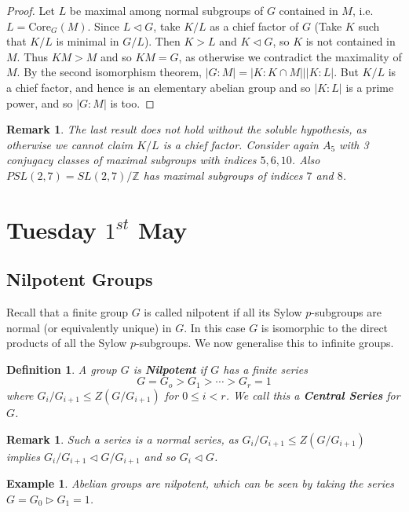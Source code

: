\documentclass[a4paper,10pt]{article}
\newcommand{\ZZ}{\mathbb{Z}}
\newtheorem{Def}[thm]{Definition}
\newtheorem{eg}[thm]{Example}
\newtheorem{rem}[thm]{Remark}
\begin{document}
\begin{proof}
Let $L$ be maximal among normal subgroups of $G$ contained in $M$, i.e. $L = \text{Core}_G(M)$. Since $L \triangleleft G$, take $K / L$ as a chief factor of $G$ (Take $K$ such that $K / L$ is minimal in $G / L$). Then $K > L$ and $K \triangleleft G$, so $K$ is not contained in $M$. Thus $KM > M$ and so $KM = G$, as otherwise we contradict the maximality of $M$. By the second isomorphism theorem, $|G : M| = |K : K \cap M| \big| |K : L|$. But $K  / L$ is a chief factor, and hence is an elementary abelian group and so $|K : L |$ is a prime power, and so $|G:M|$ is too.
\end{proof}

\begin{rem}
The last result does not hold without the soluble hypothesis, as otherwise we cannot claim $K / L$ is a chief factor. Consider again $A_5$ with 3 conjugacy classes of maximal subgroups with indices $5,6,10$. Also $PSL(2,7) = SL(2,7) / \ZZ$ has maximal subgroups of indices $7$ and $8$.
\end{rem}


\newpage
\section{Tuesday $1^{st}$ May}
\subsection*{Nilpotent Groups}
Recall that a finite group $G$ is called nilpotent if all its Sylow $p$-subgroups are normal (or equivalently unique) in $G$. In this case $G$ is isomorphic to the direct products of all the Sylow $p$-subgroups. We now generalise this to infinite groups.
\begin{Def}
A group $G$ is \textbf{Nilpotent} if $G$ has a finite series
\[ G = G_o > G_1 > \cdots > G_r = 1 \]
where $G_i / G_{i+1} \leq Z(G / G_{i+1})$ for $0 \leq i < r$. We call this a \textbf{Central Series} for $G$.
\end{Def}

\begin{rem}
Such a series is a normal series, as $G_i / G_{i+1} \leq Z(G / G_{i+1})$ implies $G_i / G_{i+1} \triangleleft G / G_{i+1}$ and so $G_i \triangleleft G$. 
\end{rem}

\begin{eg}
Abelian groups are nilpotent, which can be seen by taking the series $G = G_0 \triangleright G_1 = 1$. 
\end{eg}
\end{document}
